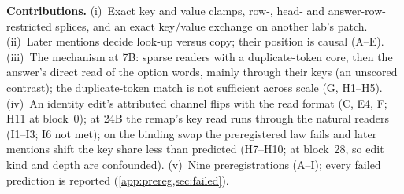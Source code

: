 \textbf{Contributions.} (i)~Exact key and value clamps, row-, head- and answer-row-restricted splices, and an exact key/value exchange on another lab's patch. (ii)~Later mentions decide look-up versus copy; their position is causal (A--E). (iii)~The mechanism at 7B: sparse readers with a duplicate-token core, then the answer's direct read of the option words, mainly through their keys (an unscored contrast); the duplicate-token match is not sufficient across scale (G, H1--H5). (iv)~An identity edit's attributed channel flips with the read format (C, E4, F; H11 at block~0); at 24B the remap's key read runs through the natural readers (I1--I3; I6 not met); on the binding swap the preregistered law fails and later mentions shift the key share less than predicted (H7--H10; at block~28, so edit kind and depth are confounded). (v)~Nine preregistrations (A--I); every failed prediction is reported (\cref{app:prereg,sec:failed}).

